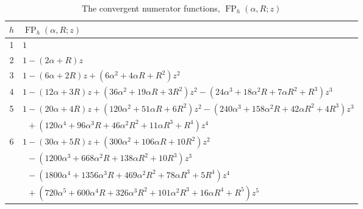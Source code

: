 \documentclass[12pt,reqno]{article}
\numberwithin{sfootnote}{section}
\newcommand{\subtablewidth}{\textwidth}
\newcommand{\subtableskip}{\bigskip}
\newcommand{\tabletopstrut}[0]{\rule{0pt}{3ex}}
\newcommand{\tablebottomstrut}[0]{\rule{0pt}{3ex}}
\numberwithin{equation}{section}
\theoremstyle{plain}
\theoremstyle{definition}
\theoremstyle{remark}
\newcommand{\ConvFP}[4]{\ensuremath{\FP_{#1}\left(#2, #3; #4\right)}}
\DeclareMathOperator{\FP}{FP}
\begin{document}
\begin{table}[h] 

\smaller 
\centering 

\begin{subtable}{\subtablewidth} 
\centering 

\begin{tabular}{|c|l|} \hline 
\hline\tabletopstrut  
$h$ & $\ConvFP{h}{\alpha}{R}{z}$ \tablebottomstrut \\ \hline 
1 & $1$ \\ 
2 & $1 - (2\alpha+R)z$ \\ 
3 & $1 - (6\alpha+2R)z + (6\alpha^2+4\alpha R+R^2)z^2$ \\ 
4 & $1 - (12\alpha+3R)z + (36\alpha^2+19\alpha R+3R^2)z^2 - 
           (24\alpha^3 + 18\alpha^2R + 7\alpha R^2 + R^3) z^3$ \\ 
5 & $1 - (20 \alpha + 4 R) z + (120 \alpha^2 + 51 \alpha R + 6 R^2) z^2 - 
     (240 \alpha^3 + 158 \alpha^2 R + 42 \alpha R^2 + 4 R^3) z^3$ \\ 
  & $\phantom{1} + 
     (120 \alpha^4 + 96 \alpha^3 R + 46 \alpha^2 R^2 + 11 \alpha R^3 + R^4) z^4$ \\ 
6 & $1 - (30 \alpha + 5 R) z + (300 \alpha^2 + 106 \alpha R + 10 R^2) z^2$ \\ 
  & $\phantom{1} - 
     (1200 \alpha^3 + 668 \alpha^2 R + 138 \alpha R^2 + 10 R^3) z^3$ \\ 
   & $\phantom{1} - 
     (1800 \alpha^4 + 1356 \alpha^3 R + 469 \alpha^2 R^2 + 78 \alpha R^3 + 5 R^4) z^4$ \\ 
   & $\phantom{1} + 
     (720 \alpha^5 + 600 \alpha^4 R + 326 \alpha^3 R^2 + 101 \alpha^2 R^3 + 16 \alpha R^4 + R^5) z^5$ \\ \hline 
\hline 
\end{tabular} 
\caption{The convergent numerator functions, $\ConvFP{h}{\alpha}{R}{z}$} 

\subtableskip 


\end{subtable}
\end{table}
\end{document}
